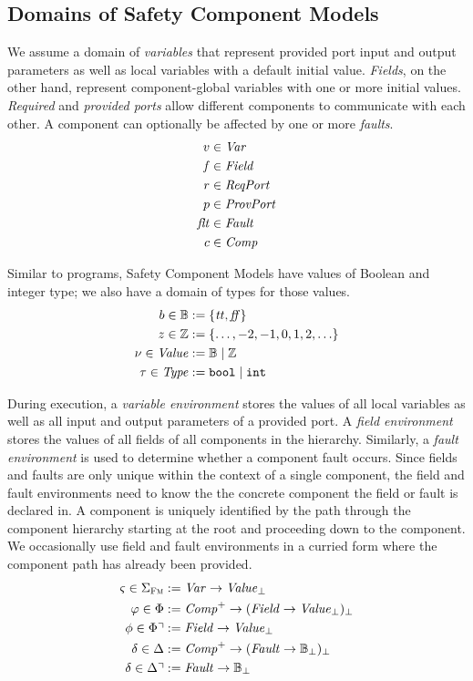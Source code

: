 \documentclass[a4paper,10pt,english]{article}
\begin{document}
\subsection{Domains of Safety Component Models}
We assume a domain of \textit{variables} that represent provided port input and output parameters as well as local variables with
a default initial value. \textit{Fields}, on the other hand, represent component-global variables with one or more initial values.
\textit{Required} and \textit{provided ports} allow different components to communicate with each other. A component can
optionally be affected by one or more \textit{faults}.
\begin{align*}
	v &\in \mathit{Var} \\
	\mathit{f} &\in \mathit{Field} \\
	r &\in \mathit{ReqPort} \\
	p &\in \mathit{ProvPort} \\
	\mathit{flt} &\in \mathit{Fault} \\
	c&\in \mathit{Comp}
\end{align*}

Similar to \Fil programs, Safety Component Models have values of Boolean and integer type; we also have a domain of types
for those values.
\begin{align*}
    b \in \mathbb{B} &:= \{ \mathit{tt}, \mathit{ff} \}
    \\
    z \in \mathbb{Z} &:= \{ \ldots, -2, -1, 0, 1, 2, \ldots \}
    \\
    \nu \in \mathit{Value} &:= \mathbb{B} \mid \mathbb{Z}
    \\
	\tau \in \mathit{Type} &:= \mathtt{bool} \mid \mathtt{int}
\end{align*}

During execution, a \textit{variable environment} stores the values of all local variables as well as all input and output
parameters of a provided port.
A \textit{field environment} stores the values of all fields of all components in the hierarchy. Similarly, a \textit{fault
environment} is used to determine whether a component fault occurs. Since fields and faults are only unique within the context of
a single component, the field and fault environments need to know the the concrete component the field or fault is declared in.
A component is uniquely identified by the path through the component hierarchy starting at the root and proceeding down to the
component. We occasionally use field and fault environments in a curried form where the component path has already been provided.
\begin{align*}
	\varsigma \in \Sigma_\textsc{Fm} &:= \mathit{Var} \rightarrow \mathit{Value}_\bot \\
	\varphi \in \Phi &:= \mathit{Comp}^+ \rightarrow (\mathit{Field} \rightarrow \mathit{Value}_\bot)_\bot \\
	\phi \in \Phi\urcorner &:= \mathit{Field} \rightarrow \mathit{Value}_\bot \\
	\delta \in \Delta &:= \mathit{Comp}^+ \rightarrow (\mathit{Fault} \rightarrow \mathbb{B}_\bot)_\bot \\
	\delta \in \Delta\urcorner &:= \mathit{Fault} \rightarrow \mathbb{B}_\bot
\end{align*}
\end{document}
